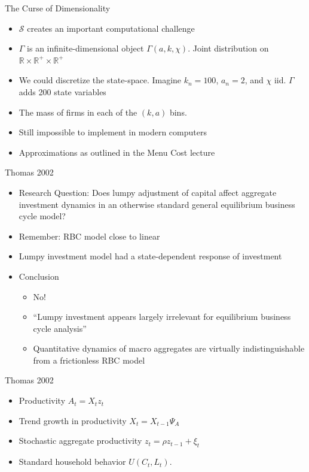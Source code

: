 \documentclass[11pt,aspectratio=169,xcolor={dvipsnames},hyperref={pdftex,pdfpagemode=UseNone,hidelinks,pdfdisplaydoctitle=true},usepdftitle=false]{beamer}
\begin{document}
\begin{frame}{The Curse of Dimensionality}
\begin{itemize}
\item $\mathcal{S}$ creates an important computational challenge
\item $\Gamma$ is an infinite-dimensional object $\Gamma(a,k,\chi)$. Joint distribution on $\mathbb{R} \times \mathbb{R^+}\times \mathbb{R}^+$
\item We could discretize the state-space. Imagine $k_n = 100$, $a_n = 2$, and $\chi$ iid. $\Gamma$ adds 200 state variables
\item The mass of firms in each of the $(k,a)$ bins.
\item Still impossible to implement in modern computers
\item Approximations as outlined in the Menu Cost lecture
\end{itemize}
\end{frame}


\begin{frame}{Thomas 2002}
\begin{itemize}
\item Research Question: Does lumpy adjustment of capital affect aggregate investment dynamics in an otherwise standard general equilibrium business cycle model?
\item Remember: RBC model close to linear
\item Lumpy investment model had a state-dependent response of investment
\item Conclusion
\begin{itemize}
\item No!
\item ``Lumpy investment appears largely irrelevant for equilibrium business cycle analysis''
\item Quantitative dynamics of macro aggregates are virtually indistinguishable from a frictionless RBC model
\end{itemize}
\end{itemize}
\end{frame}




\begin{frame}{Thomas 2002}
\begin{itemize}
\item Productivity $A_t = X_t z_t$
\item Trend growth in productivity $X_t = X_{t-1}\Psi_A$
\item Stochastic aggregate productivity $z_t = \rho z_{t-1} + \xi_t$
\item Standard household behavior $U(C_t,L_t)$.
\end{itemize}
\end{frame}
\end{document}
